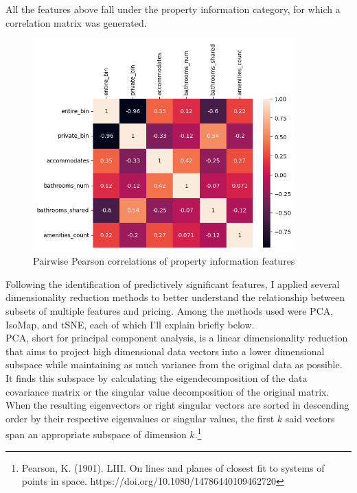 \documentclass[12pt]{article}
\newtheorem{Proof of Lemma}{Proof of Lemma}
\begin{document}
All the features above fall under the property information category, for which a correlation matrix was generated.

\begin{figure}[H]
	\includegraphics*[width=0.9\textwidth]{../figures/property_features/property_corr.png}
	\caption*{Pairwise Pearson correlations of property information features}
\end{figure}

Following the identification of predictively significant features, I applied several dimensionality reduction  methods to better understand the relationship between subsets of multiple features and pricing. Among the methods used were PCA, IsoMap, and tSNE, each of which I'll explain briefly below. \\

PCA, short for principal component analysis, is a linear dimensionality reduction that aims to project high dimensional data vectors into a lower dimensional subspace while maintaining as much variance from the original data as possible. It finds this subspace by calculating the eigendecomposition of the data covariance matrix or the singular value decomposition of the original matrix. When the resulting eigenvectors or right singular vectors are sorted in descending order by their respective eigenvalues or singular values, the first $k$ said vectors span an appropriate subspace of dimension $k$.\footnote{Pearson, K. (1901). LIII. On lines and planes of closest fit to systems of points in space. https://doi.org/10.1080/14786440109462720} \\ 
\end{document}
